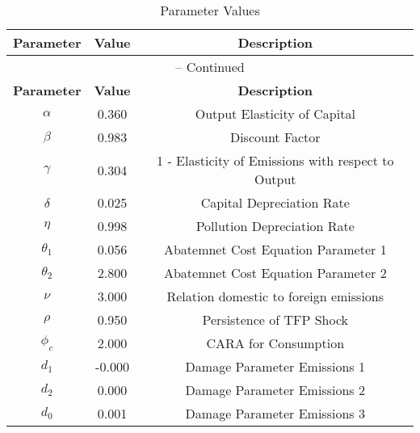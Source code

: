 \begin{center}
\begin{longtable}{ccc}
\caption{Parameter Values}\\%
\toprule%
\multicolumn{1}{c}{\textbf{Parameter}} &
\multicolumn{1}{c}{\textbf{Value}} &
 \multicolumn{1}{c}{\textbf{Description}}\\%
\midrule%
\endfirsthead
\multicolumn{3}{c}{{\tablename} \thetable{} -- Continued}\\%
\midrule%
\multicolumn{1}{c}{\textbf{Parameter}} &
\multicolumn{1}{c}{\textbf{Value}} &
  \multicolumn{1}{c}{\textbf{Description}}\\%
\midrule%
\endhead
${\alpha}$ 	 & 	 0.360 	 & 	 Output Elasticity of Capital\\
${\beta}$ 	 & 	 0.983 	 & 	 Discount Factor\\
${\gamma}$ 	 & 	 0.304 	 & 	 1 - Elasticity of Emissions with respect to Output\\
${\delta}$ 	 & 	 0.025 	 & 	 Capital Depreciation Rate\\
${\eta}$ 	 & 	 0.998 	 & 	 Pollution Depreciation Rate\\
${\theta_1}$ 	 & 	 0.056 	 & 	 Abatemnet Cost Equation Parameter 1\\
${\theta_2}$ 	 & 	 2.800 	 & 	 Abatemnet Cost Equation Parameter 2\\
${\nu}$ 	 & 	 3.000 	 & 	 Relation domestic to foreign emissions\\
${\rho}$ 	 & 	 0.950 	 & 	 Persistence of TFP Shock\\
${\phi_c}$ 	 & 	 2.000 	 & 	 CARA for Consumption\\
${d_1}$ 	 & 	 -0.000 	 & 	 Damage Parameter Emissions 1\\
${d_2}$ 	 & 	 0.000 	 & 	 Damage Parameter Emissions 2\\
${d_0}$ 	 & 	 0.001 	 & 	 Damage Parameter Emissions 3\\
\bottomrule%
\end{longtable}
\end{center}
